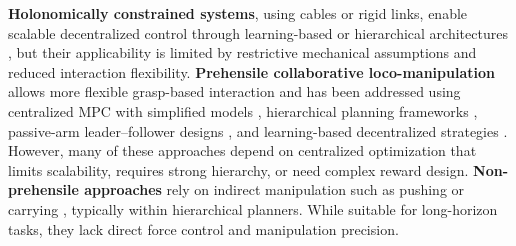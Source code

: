 \textbf{Holonomically constrained systems},
using cables or rigid links, enable scalable decentralized control through learning-based or hierarchical architectures \cite{pandit2024,kim2023,yang2022}, but their applicability is limited by restrictive mechanical assumptions and reduced interaction flexibility.
\textbf{Prehensile collaborative loco-manipulation} allows more flexible grasp-based interaction and has been addressed using centralized MPC with simplified models \cite{devincenti2023}, hierarchical planning frameworks \cite{rigo2025hierarchical}, passive-arm leader–follower designs \cite{turrisi2024}, and learning-based decentralized strategies \cite{pandit2025multi,an2025collaborative}. However, many of these approaches depend on centralized optimization that limits scalability, requires strong hierarchy, or need complex reward design.
\textbf{Non-prehensile approaches} rely on indirect manipulation such as pushing or carrying \cite{feng2025learning,sombolestan2024,ji2021reinforcement}, typically within hierarchical planners. While suitable for long-horizon tasks, they lack direct force control and manipulation precision.

